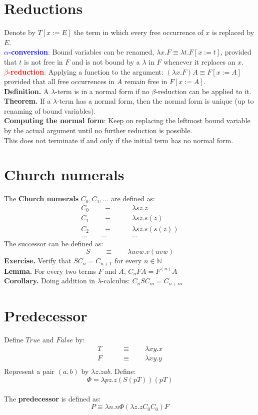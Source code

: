 \documentclass{article}
\begin{document}
\section{Reductions}
Denote by $T[x := E]$ the term in which every free occurrence of $x$ is replaced by $E$.\medskip
\\\textbf{\textcolor{blue}{$\alpha$-conversion}}: Bound variables can be renamed, $\lambda x.F \equiv \lambda t.F[x := t]$, provided that $t$ is not free in $F$ and is not bound by a $\lambda$ in $F$ whenever it replaces an $x$.\medskip
\\\textbf{\textcolor{red}{$\beta$-reduction}}: Applying a function to the argument: $(\lambda x.F)A \equiv F[x:=A]$ provided that all free occurrences in $A$ remain free in $F [x:=A]$.\medskip
\\\textbf{Definition.} A $\lambda$-term is in a normal form if no $\beta$-reduction can be applied to it.\medskip
\\\textbf{Theorem.} If a $\lambda$-term has a normal form, then the normal form is unique (up to renaming of bound variables).\medskip
\\\textbf{Computing the normal form}: Keep on replacing the leftmost bound variable by the actual argument until no further reduction is possible.
\\ This does not terminate if and only if the initial term has no normal form.

\section{Church numerals}
The \textbf{Church numerals} $C_0, C_1, ...$ are defined as:
\begin{align*}
C_0\qquad\equiv&\qquad\lambda sz.z \\
C_1\qquad\equiv&\qquad\lambda sz.s(z) \\
C_2\qquad\equiv&\qquad\lambda sz.s(s(z)) \\
...\qquad...&\qquad...
\end{align*}
The successor can be defined as:
$$S\qquad\equiv\qquad\lambda uvw.v(uvw)$$
\textbf{Exercise.} Verify that $SC_n = C_{n+1}$ for every $n \in \mathbb{N}$\medskip
\\\textbf{Lemma.} For every two terms $F$ and $A$, $C_nFA = F^{(n)}A$\medskip
\\\textbf{Corollary.} Doing addition in $\lambda$-calculus: $C_nSC_m = C_{n+m}$

\section{Predecessor}
Define $True$ and $False$ by:
\begin{align*}
T\qquad&\equiv\qquad\lambda xy.x\\
F\qquad&\equiv\qquad\lambda xy.y\\
\end{align*}
Represent a pair $(a, b)$ by $\lambda z.zab$. Define:
$$\Phi = \lambda pz.z(S(pT))(pT)$$\medskip
\\ The \textbf{predecessor} is defined as:
$$P\equiv \lambda n.n\Phi(\lambda z.zC_0C_0)F$$
\end{document}
